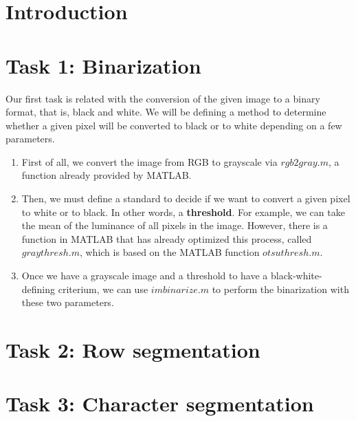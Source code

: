 \documentclass[10pt]{article}
\begin{document}
\renewcommand*\contentsname{Table of contents}
\tableofcontents
\newpage
\section{Introduction}
\section{{Task 1: Binarization}}
    \indent Our first task is related with the conversion of the given image to a binary format, that is, black and white. We will be defining a method to determine whether a given pixel will be converted to black or to white depending on a few parameters. \newline \newline 
    \begin{enumerate}
        \item First of all, we convert the image from RGB to grayscale via $rgb2gray.m$, a function already provided by MATLAB.
        \item Then, we must define a standard to decide if we want to convert a given pixel to white or to black. In other words, a \textbf{threshold}. For example, we can take the mean of the luminance of all pixels in the image. However, there is a function in MATLAB that has already optimized this process, called $graythresh.m$, which is based on the MATLAB function $otsuthresh.m$. \small{\cite{otsu}}
        \item Once we have a grayscale image and a threshold to have a black-white-defining criterium, we can use $imbinarize.m$ to perform the binarization with these two parameters.
    \end{enumerate} 

\section{Task 2: Row segmentation}
\section{Task 3: Character segmentation}
\end{document}
